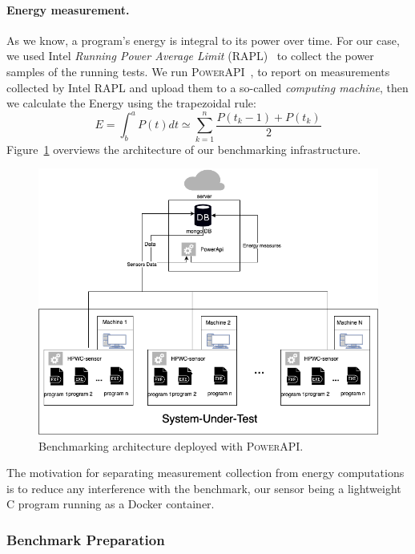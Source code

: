 \paragraph{Energy measurement.}
As we know, a program's energy is integral to its power over time.
For our case, we used Intel \emph{Running Power Average Limit} (RAPL)~\cite{Khan:2018:RAE:3199681.3177754} to collect the power samples of the running tests.
We run \textsc{PowerAPI}~\cite{DBLP:journals/jss/ColmantRKSFS18}, to report on measurements collected by Intel RAPL and upload them to a so-called \emph{computing machine}, then we calculate the Energy using the trapezoidal rule:
\begin{equation}
      E = \int^a_b P(t)dt \simeq \sum^n_{k=1} \frac{P(t_k-1)+P(t_k)}{2}
\end{equation}
Figure~\ref{fig:powerapi} overviews the architecture of our benchmarking infrastructure.

\begin{figure}[hbt]
      \centering
      \includegraphics[width=.8\linewidth]{imgs/SmartWatts.png}
      \caption{Benchmarking architecture deployed with \textsc{PowerAPI}.}
      \label{fig:powerapi}
\end{figure}

The motivation for separating measurement collection from energy computations is to reduce any interference with the benchmark, our sensor being a lightweight C program running as a Docker container.

\subsubsection{Benchmark Preparation}
